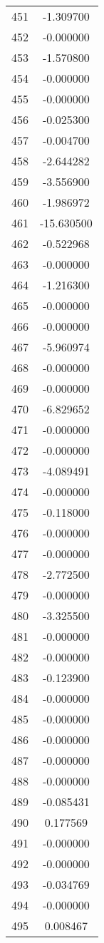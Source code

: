 \documentclass[12pt]{article}
\begin{document}
\begin{longtable}{@{}cc@{}}
451 & -1.309700 \\
452 & -0.000000 \\
453 & -1.570800 \\
454 & -0.000000 \\
455 & -0.000000 \\
456 & -0.025300 \\
457 & -0.004700 \\
458 & -2.644282 \\
459 & -3.556900 \\
460 & -1.986972 \\
461 & -15.630500 \\
462 & -0.522968 \\
463 & -0.000000 \\
464 & -1.216300 \\
465 & -0.000000 \\
466 & -0.000000 \\
467 & -5.960974 \\
468 & -0.000000 \\
469 & -0.000000 \\
470 & -6.829652 \\
471 & -0.000000 \\
472 & -0.000000 \\
473 & -4.089491 \\
474 & -0.000000 \\
475 & -0.118000 \\
476 & -0.000000 \\
477 & -0.000000 \\
478 & -2.772500 \\
479 & -0.000000 \\
480 & -3.325500 \\
481 & -0.000000 \\
482 & -0.000000 \\
483 & -0.123900 \\
484 & -0.000000 \\
485 & -0.000000 \\
486 & -0.000000 \\
487 & -0.000000 \\
488 & -0.000000 \\
489 & -0.085431 \\
490 & 0.177569 \\
491 & -0.000000 \\
492 & -0.000000 \\
493 & -0.034769 \\
494 & -0.000000 \\
495 & 0.008467 \\

\end{longtable}
\end{document}
